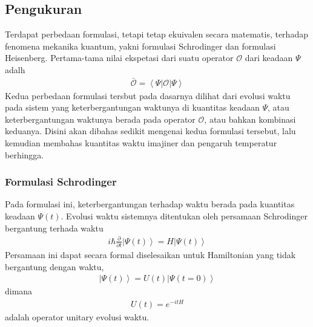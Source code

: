 \chapter{\babDua}

\section{Pengukuran}
Terdapat perbedaan formulasi\cite{fetter}, tetapi tetap ekuivalen secara matematis, terhadap fenomena mekanika kuantum, yakni formulasi Schrodinger dan formulasi Heisenberg. Pertama-tama nilai ekspetasi dari suatu operator $\mathcal{O}$ dari keadaan $\Psi$ adalh
\begin{align}
\bar{\mathcal{O}} = \left\langle \Psi | \mathcal{O} | \Psi \right\rangle
\end{align}
Kedua perbedaan formulasi tersbut pada dasarnya dilihat dari evolusi waktu pada sistem yang keterbergantungan waktunya di kuantitas keadaan $\Psi$, atau keterbergantungan waktunya berada pada operator $\mathcal{O}$, atau bahkan kombinasi keduanya. Disini akan dibahas sedikit mengenai kedua formulasi tersebut, lalu kemudian membahas kuantitas waktu imajiner dan pengaruh temperatur berhingga.

\subsection{Formulasi Schrodinger}
Pada formulasi ini, keterbergantungan terhadap waktu berada pada kuantitas keadaan $\Psi(t)$. Evolusi waktu sistemnya ditentukan oleh persamaan Schrodinger bergantung terhada waktu
\begin{align}
i\hbar \frac{\partial}{\partial t} \left\vert \Psi(t) \right\rangle = H\left\vert \Psi(t) \right\rangle
\end{align}
Persamaan ini dapat secara formal diselesaikan untuk Hamiltonian yang tidak bergantung dengan waktu,
\begin{align}
\left\vert \Psi(t) \right\rangle = U(t) \left\vert \Psi(t = 0) \right\rangle
\end{align}
dimana
\begin{align}
U(t) = e^{-itH}
\end{align}
adalah operator unitary evolusi waktu.

